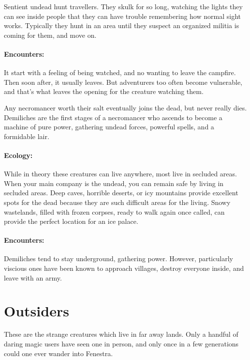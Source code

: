 Sentient undead hunt travellers.  They skulk for so long, watching the lights they can see inside people that they can have trouble remembering how normal sight works.  Typically they hunt in an area until they suspect an organized militia is coming for them, and move on.

\paragraph{Encounters:}  It start with a feeling of being watched, and no wanting to leave the campfire.  Then soon after, it usually leaves.  But adventurers too often become vulnerable, and that's what leaves the opening for the creature watching them.


\label{demilich}

Any necromancer worth their salt eventually joins the dead, but never really dies.  Demiliches are the first stages of a necromancer who ascends to become a machine of pure power, gathering undead forces, powerful spells, and a formidable lair.

\demilich

\paragraph{Ecology:} While in theory these creatures can live anywhere, most live in secluded areas.  When your main company is the undead, you can remain safe by living in secluded areas.  Deep caves, horrible deserts, or icy mountains provide excellent spots for the dead because they are such difficult areas for the living.  Snowy wastelands, filled with frozen corpses, ready to walk again once called, can provide the perfect location for an ice palace.

\paragraph{Encounters:} Demiliches tend to stay underground, gathering power.  However, particularly viscious ones have been known to approach villages, destroy everyone inside, and leave with an army.

\section{Outsiders}

These are the strange creatures which live in far away lands.  Only a handful of daring magic users have seen one in person, and only once in a few generations could one ever wander into Fenestra.

